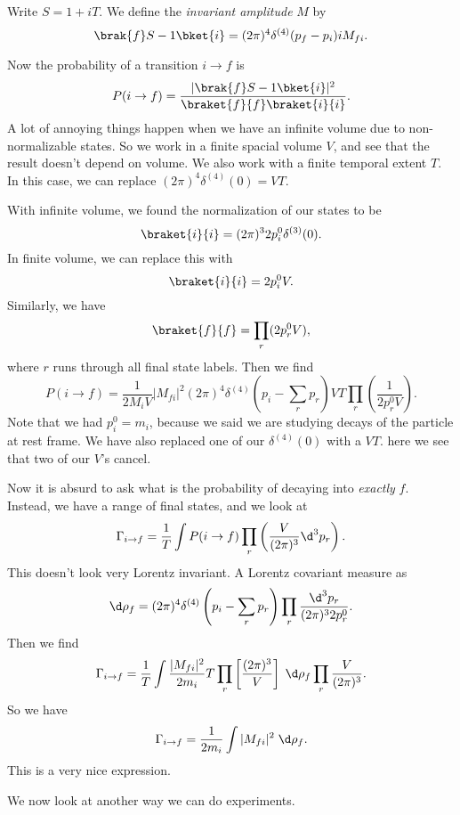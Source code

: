 \documentclass[a4paper]{article}
\begin{document}
\begin{defi}
  Write $S = 1 + iT$. We define the \emph{invariant amplitude} $M$ by
  \[
    \brak{f}S - 1 \bket{i} = (2\pi)^4 \delta^{(4)}(p_f - p_i) i M_{fi}.
  \]
\end{defi}
Now the probability of a transition $i \to f$ is
\[
  P(i \to f) = \frac{|\brak{f}S - 1 \bket{i}|^2}{\braket{f}{f}\braket{i}{i}}.
\]
A lot of annoying things happen when we have an infinite volume due to non-normalizable states. So we work in a finite spacial volume $V$, and see that the result doesn't depend on volume. We also work with a finite temporal extent $T$. In this case, we can replace $(2\pi)^4 \delta^{(4)}(0) = VT$. %

With infinite volume, we found the normalization of our states to be
\[
  \braket{i}{i} = (2\pi)^3 2 p_i^0 \delta^{(3)}(0).
\]
In finite volume, we can replace this with
\[
  \braket{i}{i} = 2p_i^0 V.
\]
Similarly, we have
\[
  \braket{f}{f} = \prod_r (2 p_r^0 V),
\]
where $r$ runs through all final state labels. Then we find
\[
  P(i \to f) = \frac{1}{2 M_i V}|M_{fi}|^2 (2\pi)^4 \delta^{(4)}\left(p_i - \sum_r p_r\right) VT \prod_r \left(\frac{1}{2 p_r^0 V}\right).
\]
Note that we had $p_i^0 = m_i$, because we said we are studying decays of the particle at rest frame. We have also replaced one of our $\delta^{(4)}(0)$ with a $VT$. here we see that two of our $V$'s cancel.

Now it is absurd to ask what is the probability of decaying into \emph{exactly} $f$. Instead, we have a range of final states, and we look at
\[
  \Gamma_{i \to f} = \frac{1}{T} \int P(i \to f) \prod_r \left(\frac{V}{(2\pi)^3}\d^3 p_r\right).
\]
This doesn't look very Lorentz invariant. A Lorentz covariant measure as
\[
  \d \rho_f = (2\pi)^4 \delta^{(4)}\left(p_i - \sum_r p_r\right) \prod_r \frac{\d^3 p_r}{(2\pi)^3 2 p_r^0}.
\]
Then we find
\[
  \Gamma_{i \to f} = \frac{1}{T} \int \frac{|M_{fi}|^2}{2m_i} T \prod_r \left[\frac{(2\pi)^3}{V}\right] \;\d \rho_f \prod_r \frac{V}{(2\pi)^3}.
\]
So we have
\[
  \Gamma_{i \to f} = \frac{1}{2 m_i} \int |M_{fi}|^2 \;\d \rho_f.
\]
This is a very nice expression.

We now look at another way we can do experiments.
\end{document}

